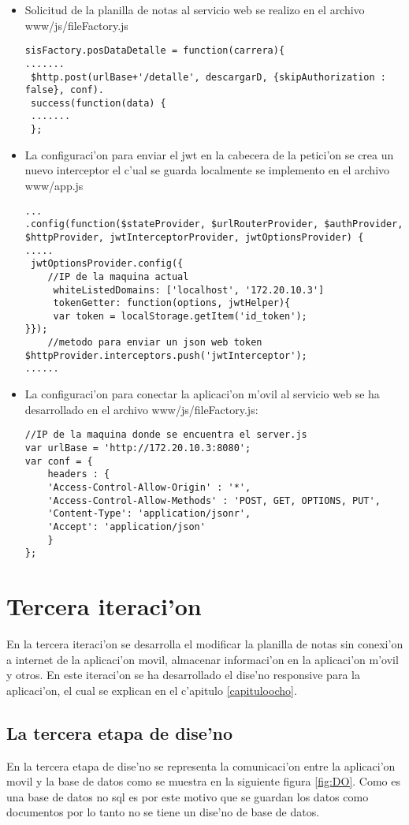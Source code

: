 \begin{itemize}
\item Solicitud de la planilla de notas al servicio web se realizo en el archivo www/js/fileFactory.js

\begin{verbatim}
sisFactory.posDataDetalle = function(carrera){
.......
 $http.post(urlBase+'/detalle', descargarD, {skipAuthorization : false}, conf).
 success(function(data) {
 .......
 }; 
\end{verbatim}

\item La configuraci'on para enviar el jwt en la cabecera de la petici'on se crea un nuevo interceptor el c'ual se guarda localmente se implemento en el archivo www/app.js

\begin{verbatim}
...
.config(function($stateProvider, $urlRouterProvider, $authProvider, 
$httpProvider, jwtInterceptorProvider, jwtOptionsProvider) { 
.....
 jwtOptionsProvider.config({
 	//IP de la maquina actual 
	 whiteListedDomains: ['localhost', '172.20.10.3'] 
	 tokenGetter: function(options, jwtHelper){
	 var token = localStorage.getItem('id_token');
}});
	//metodo para enviar un json web token
$httpProvider.interceptors.push('jwtInterceptor');
......
\end{verbatim}
\item La configuraci'on para conectar la aplicaci'on m'ovil al servicio web se ha desarrollado en el archivo www/js/fileFactory.js: 
\begin{verbatim}
//IP de la maquina donde se encuentra el server.js
var urlBase = 'http://172.20.10.3:8080';
var conf = {
	headers : {
	'Access-Control-Allow-Origin' : '*',
    'Access-Control-Allow-Methods' : 'POST, GET, OPTIONS, PUT',
    'Content-Type': 'application/jsonr',
    'Accept': 'application/json'
    } 
};
\end{verbatim}
\end{itemize}

\section{Tercera iteraci'on}
En la tercera iteraci'on se desarrolla el modificar la planilla de notas sin conexi'on a internet de la aplicaci'on movil, almacenar informaci'on en la aplicaci'on m'ovil y otros. En este iteraci'on se ha desarrollado el dise'no responsive para la aplicaci'on, el cual se explican en el c'apitulo \ref{capituloocho}.
\subsection{La tercera etapa de dise'no}
En la tercera etapa de dise'no se representa la comunicaci'on entre la aplicaci'on movil y la base de datos como se muestra en la siguiente figura \ref{fig:DO}. Como es una base de datos no sql es por este motivo que se guardan los datos como documentos por lo tanto no se tiene un dise'no de base de datos.


